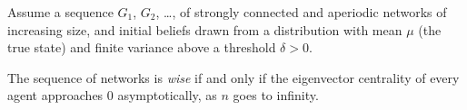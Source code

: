 \documentclass[preview, border={0pt 5pt 0pt 1pt}, varwidth=13cm]{standalone} %
\begin{document}
    Assume a sequence \(G_1\), \(G_2\), \dots, of strongly connected and aperiodic networks of increasing size, 
    and initial beliefs drawn from a distribution with mean \(\mu\) (the true state) and 
    finite variance above a threshold \(\delta > 0\).
    \vspace{1em}

    The sequence of networks is \emph{wise} if and only if the eigenvector centrality of every agent 
    approaches \(0\) asymptotically, as \(n\) goes to infinity.



    



\end{document}
